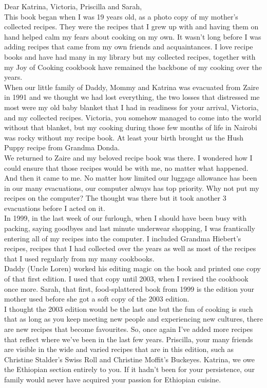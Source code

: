 \documentclass[11pt]{memoir} %
\begin{document}
Dear Katrina, Victoria, Priscilla and Sarah, \\[10pt]
This book began when I was 19 years old, as a photo copy of my mother's collected recipes. They were the recipes that I grew up with and having them on hand helped calm my fears about cooking on my own. It wasn't long before I was adding recipes that came from my own friends and acquaintances. I love recipe books and have had many in my library but my collected recipes, together with my Joy of Cooking cookbook have remained the backbone of my cooking over the years. \\[10pt]
When our little family of Daddy, Mommy and Katrina was evacuated from Zaire in 1991 and we thought we had lost everything, the two losses that distressed me most were my old baby blanket that I had in readiness for your arrival, Victoria, and my collected recipes. Victoria, you somehow managed to come into the world without that blanket, but my cooking during those few months of life in Nairobi was rocky without my recipe book. At least your birth brought us the Hush Puppy recipe from Grandma Donda. \\[10pt]
We returned to Zaire and my beloved recipe book was there. I wondered how I could ensure that those recipes would be with me, no matter what happened. And then it came to me. No matter how limited our luggage allowance has been in our many evacuations, our computer always has top priority. Why not put my recipes on the computer? The thought was there but it took another 3 evacuations before I acted on it. \\[10pt]
In 1999, in the last week of our furlough, when I should have been busy with   packing, saying goodbyes and last minute underwear shopping, I was frantically entering all of my recipes into the computer. I included Grandma Hiebert's recipes, recipes that I had collected over the years as well as most of the recipes that I used regularly from my many cookbooks. \\[10pt]
Daddy (Uncle Loren) worked his editing magic on the book and printed one copy of that first edition. I used that copy until 2003, when I revised the cookbook once more. Sarah, that first, food-splattered book from 1999 is the edition your mother used before she got a soft copy of the 2003 edition. \\[10pt]
I thought the 2003 edition would be the last one but the fun of cooking is such that as long as you keep meeting new people and experiencing new cultures, there are new recipes that become favourites. So, once again I've added more recipes that reflect where we've been in the last few years. Priscilla, your many friends are visible in the wide and varied recipes that are in this edition, such as Christine Stalder's Swiss Roll and Christine Moffit's Buckeyes. Katrina, we owe the Ethiopian section entirely to you. If it hadn't been for your persistence, our family would never have acquired your passion for Ethiopian cuisine. \\[10pt]
\end{document}
